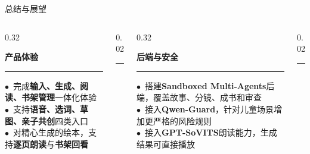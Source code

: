 \documentclass{beamer}
\newcommand{\goldstrong}[1]{\textcolor{accentgold}{\textbf{#1}}}
\newcommand{\bignum}[1]{{\fontsize{15}{17}\selectfont\bfseries\color{buptred}#1}}
\newcommand{\bignumG}[1]{{\fontsize{15}{17}\selectfont\bfseries\color{accentgold}#1}}
\newcommand{\redot}{\textcolor{buptred}{\scriptsize$\bullet$}~}
\newcommand{\golddot}{\textcolor{accentgold}{\scriptsize$\bullet$}~}
\begin{document}
\begin{frame}[t]{总结与展望}
    \vspace{0.2cm}
    \footnotesize

    \begin{columns}[T, onlytextwidth]
        \begin{column}[T]{0.32\linewidth}
            \centering\bignum{01}\par\vspace{2pt}
            \centering\textbf{\small 产品体验}
            \par\vspace{4pt}
            \noindent\textcolor{accentgold!60}{\rule{\linewidth}{0.4pt}}
            \par\vspace{4pt}\raggedright\scriptsize
            \redot 完成\textbf{输入、生成、阅读、书架管理}一体化体验\\[3pt]
            \redot 支持\textbf{语音、选词、草图、亲子共创}四类入口\\[3pt]
            \redot 对精心生成的绘本，支持\goldstrong{逐页朗读}与\goldstrong{书架回看}
        \end{column}
        \begin{column}[T]{0.02\linewidth}
            \centering\textcolor{accentgold!60}{\rule{0.4pt}{4.6em}}
        \end{column}
        \begin{column}[T]{0.32\linewidth}
            \centering\bignumG{02}\par\vspace{2pt}
            \centering\textbf{\small 后端与安全}
            \par\vspace{4pt}
            \noindent\textcolor{accentgold!60}{\rule{\linewidth}{0.4pt}}
            \par\vspace{4pt}\raggedright\scriptsize
            \golddot 搭建\goldstrong{Sandboxed Multi-Agents}后端，覆盖故事、分镜、成书和审查\\[3pt]
            \golddot 接入\goldstrong{Qwen-Guard}，针对儿童场景增加更严格的风险规则\\[3pt]
            \golddot 接入\goldstrong{GPT-SoVITS}朗读能力，生成结果可直接播放
        \end{column}
        \begin{column}[T]{0.02\linewidth}
            \centering\textcolor{accentgold!60}{\rule{0.4pt}{4.6em}}

\end{column}
\end{columns}
\end{frame}
\end{document}
